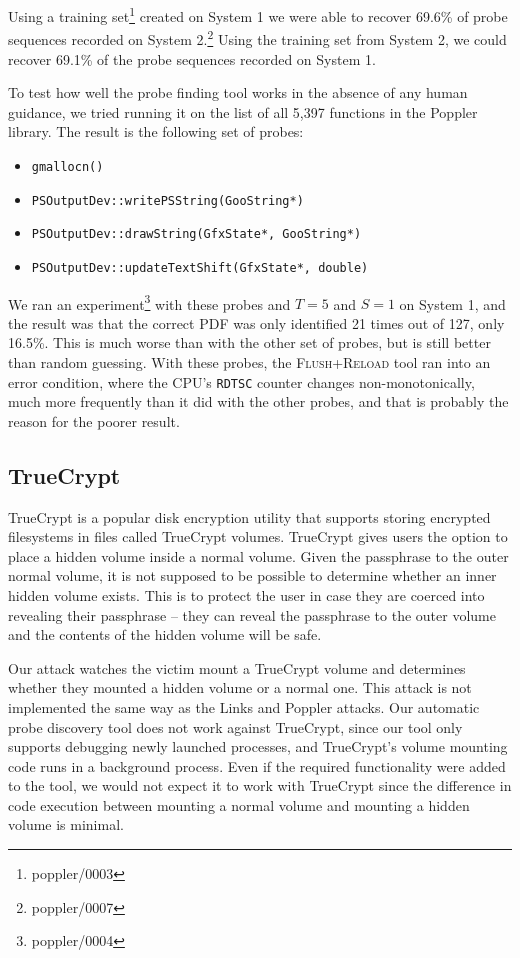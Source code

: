 \documentclass[letterpaper,twocolumn,10pt]{article}
\begin{document}
Using a training set\footnote{poppler/0003} created on System 1 we were able to
recover 69.6\% of probe sequences recorded on System 2.\footnote{poppler/0007}
Using the training set from System 2, we could recover 69.1\% of the probe
sequences recorded on System 1.

To test how well the probe finding tool works in the absence of any human
guidance, we tried running it on the list of all 5,397 functions in the
Poppler library. The result is the following set of probes:

\begin{itemize}
\setlength{\itemsep}{0pt}
    \item \texttt{gmallocn()}
    \item \texttt{PSOutputDev::writePSString(GooString*)}
    \item \texttt{PSOutputDev::drawString(GfxState*, GooString*)}
    \item \texttt{PSOutputDev::updateTextShift(GfxState*, double)}
\end{itemize}

We ran an experiment\footnote{poppler/0004} with these probes and $T=5$ and $S=1$
on System 1, and the result was that the correct PDF was only identified 21
times out of 127, only 16.5\%. This is much worse than with the other set
of probes, but is still better than random guessing. With these probes, the
\textsc{Flush+Reload} tool ran into an error condition, where the CPU's
\texttt{RDTSC} counter changes non-monotonically, much more frequently than it
did with the other probes, and that is probably the reason for the poorer
result.

\subsection{TrueCrypt}

TrueCrypt is a popular disk encryption utility that supports storing encrypted
filesystems in files called TrueCrypt volumes. TrueCrypt gives users the option
to place a hidden volume inside a normal volume. Given the passphrase to the
outer normal volume, it is not supposed to be possible to determine whether an
inner hidden volume exists. This is to protect the user in case they are coerced
into revealing their passphrase -- they can reveal the passphrase to the outer
volume and the contents of the hidden volume will be safe. 

Our attack watches the victim mount a TrueCrypt volume and determines whether
they mounted a hidden volume or a normal one. This attack is not implemented the
same way as the Links and Poppler attacks. Our automatic probe discovery tool
does not work against TrueCrypt, since our tool only supports debugging newly
launched processes, and TrueCrypt's volume mounting code runs in a background
process. Even if the required functionality were added to the tool, we would not
expect it to work with TrueCrypt since the difference in code execution between
mounting a normal volume and mounting a hidden volume is minimal.
\end{document}
